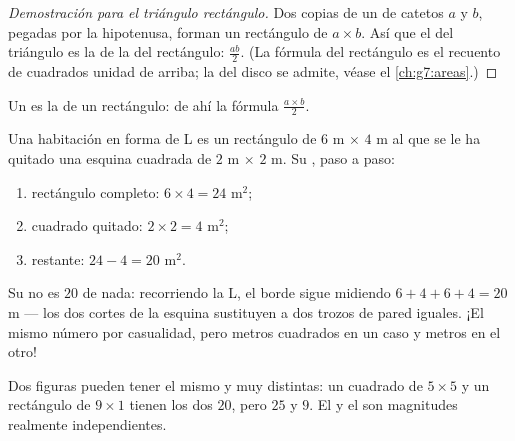 \begin{proof}[Demostración para el triángulo rectángulo]
Dos copias de un  de catetos $a$ y $b$, pegadas por la
hipotenusa, forman un rectángulo de $a \times b$. Así que el  del triángulo es la
 de la del rectángulo: $\frac{ab}{2}$. (La fórmula del rectángulo es el
recuento de cuadrados unidad de arriba; la del disco se admite, véase el
\cref{ch:g7:areas}.)
\end{proof}

\begin{omfigure}

{\small Un  es la  de un rectángulo: de ahí la fórmula
$\frac{a\times b}{2}$.}
\end{omfigure}

\begin{example}\label{ex:g6:measure:composite}
Una habitación en forma de L es un rectángulo de $6$ m $\times$ $4$ m al que se le ha quitado una
esquina cuadrada de $2$ m $\times$ $2$ m. Su , paso a paso:
\begin{enumerate}
  \item rectángulo completo: $6 \times 4 = 24$ m$^2$;
  \item cuadrado quitado: $2 \times 2 = 4$ m$^2$;
  \item {} restante: $24 - 4 = 20$ m$^2$.
\end{enumerate}
Su \emph{} no es $20$ de nada: recorriendo la L, el
borde sigue midiendo $6 + 4 + 6 + 4 = 20$ m --- los dos cortes de la
esquina sustituyen a dos trozos de pared iguales. ¡El mismo número por casualidad,
pero metros cuadrados en un caso y metros en el otro!
\end{example}

\begin{remark}
Dos figuras pueden tener el mismo  y  muy distintas: un
cuadrado de $5 \times 5$ y un rectángulo de $9 \times 1$ tienen los dos 
$20$, pero  $25$ y $9$. El  y el  son magnitudes realmente
independientes.
\end{remark}

